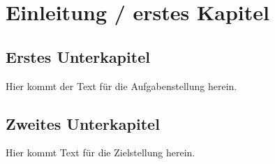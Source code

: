 \chapter{Einleitung / erstes Kapitel}
\acresetall %

\section{Erstes Unterkapitel}
Hier kommt der Text für die Aufgabenstellung herein.

\section{Zweites Unterkapitel}
Hier kommt Text für die Zielstellung herein.
